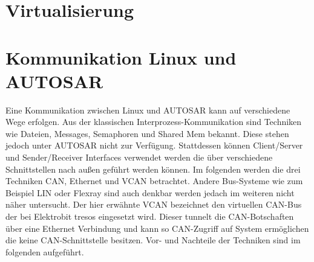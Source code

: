 \documentclass[
  a4paper,					    %
  twoside,
  DIV=calc,     				%
  bibliography=totoc,
  cleardoublepage=empty,
  ngerman,     					%
  final       					%
]{scrbook}
\begin{document}





\section{Virtualisierung}
\label{sec:Virtualisierung_Umgesetzt}




\section{Kommunikation Linux und AUTOSAR}
\label{sec:Kommunikation_L_A}

Eine Kommunikation zwischen Linux und AUTOSAR kann auf verschiedene Wege erfolgen. Aus der klassischen Interprozess-Kommunikation sind Techniken wie Dateien, Messages, Semaphoren und Shared Mem bekannt. Diese stehen jedoch unter AUTOSAR nicht zur Verfügung. Stattdessen können Client/Server und Sender/Receiver Interfaces verwendet werden die über verschiedene Schnittstellen nach außen geführt werden können. Im folgenden werden die drei Techniken CAN, Ethernet und VCAN betrachtet. Andere Bus-Systeme wie zum Beispiel LIN oder Flexray sind auch denkbar werden jedach im weiteren nicht näher untersucht. Der hier erwähnte VCAN bezeichnet den virtuellen CAN-Bus der bei Elektrobit tresos eingesetzt wird. Dieser tunnelt die CAN-Botschaften über eine Ethernet Verbindung und kann so CAN-Zugriff auf System ermöglichen die keine CAN-Schnittstelle besitzen. Vor- und Nachteile der Techniken sind im folgenden aufgeführt.
\end{document}
